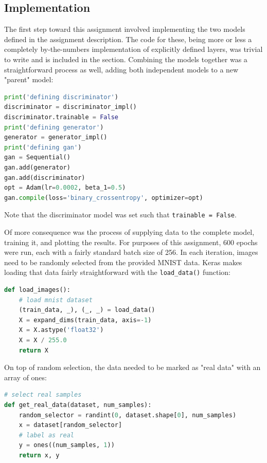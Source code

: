 \documentclass{article}
\begin{document}
\subsection{Implementation} \label{impl}
\par The first step toward this assignment involved implementing the two models defined in the assignment description. 
The code for these, being more or less a completely by-the-numbers implementation of explicitly defined layers, was trivial to write and is included in the  section.
Combining the models together was a straightforward process as well, adding both independent models to a new "parent" model:

\begin{lstlisting}[language=Python]
print('defining discriminator')
discriminator = discriminator_impl()
discriminator.trainable = False
print('defining generator')
generator = generator_impl()
print('defining gan')
gan = Sequential()
gan.add(generator)
gan.add(discriminator)
opt = Adam(lr=0.0002, beta_1=0.5)
gan.compile(loss='binary_crossentropy', optimizer=opt)
\end{lstlisting}

\par Note that the discriminator model was set such that \lstinline{trainable = False}.

\par Of more consequence was the process of supplying data to the complete model, training it, and plotting the results. 
For purposes of this assignment, 600 epochs were run, each with a fairly standard batch size of 256.
In each iteration, images need to be randomly selected from the provided MNIST data.
Keras makes loading that data fairly straightforward with the \lstinline{load_data()} function:

\begin{lstlisting}[language=Python]
def load_images():
	# load mnist dataset
	(train_data, _), (_, _) = load_data()
	X = expand_dims(train_data, axis=-1)
	X = X.astype('float32')
	X = X / 255.0
	return X
\end{lstlisting}

\par On top of random selection, the data needed to be marked as "real data" with an array of ones:

\begin{lstlisting}[language=Python]
# select real samples
def get_real_data(dataset, num_samples):
	random_selector = randint(0, dataset.shape[0], num_samples)
	x = dataset[random_selector]
	# label as real
	y = ones((num_samples, 1))
	return x, y
\end{lstlisting}
\end{document}
